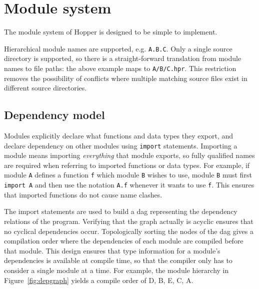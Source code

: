 \section{Module system}
\label{sec:dai_modules}



The module system of Hopper is designed to be simple to implement.

Hierarchical module names are supported, e.g. \texttt{A.B.C}. Only a single source directory is supported, so there is a straight-forward translation from module names to file paths: the above example maps to \texttt{A/B/C.hpr}. This restriction removes the possibility of conflicts where multiple matching source files exist in different source directories.

\subsection{Dependency model}
Modules explicitly declare what functions and data types they export, and declare dependency on other modules using \texttt{import} statements. Importing a module means importing \emph{everything} that module exports, so fully qualified names are required when referring to imported functions or data types. For example, if module \texttt{A} defines a function \texttt{f} which module \texttt{B} wishes to use, module \texttt{B} must first \texttt{import A} and then use the notation \texttt{A.f} whenever it wants to use \texttt{f}. This ensures that imported functions do not cause name clashes.

The import statements are used to build a \gls{dag} representing the dependency relations of the program. Verifying that the graph actually is acyclic ensures that no cyclical dependencies occur. Topologically sorting the nodes of the \gls{dag} gives a compilation order where the dependencies of each module are compiled before that module. This design ensures that type information for a module's dependencies is available at compile time, so that the compiler only has to consider a single module at a time. For example, the module hierarchy in Figure~\ref{fig:depgraph} yields a compile order of D, B, E, C, A.


